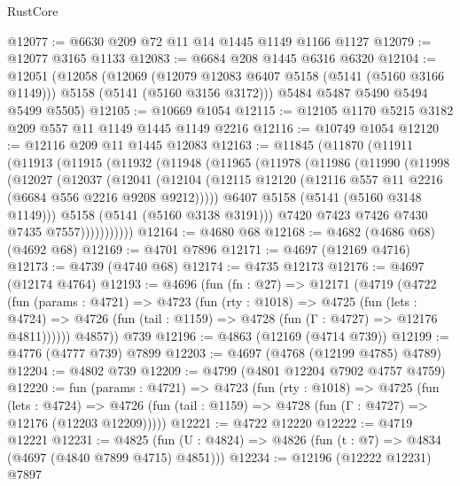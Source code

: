\begin{lexlean}{RustCore}
\begin{coremodule}
@12077 := @6630 @209 @72 @11 @14 @1445 @1149 @1166 @1127
@12079 := @12077 @3165 @1133
@12083 := @6684 @208 @1445 @6316 @6320
@12104 := @12051
    (@12058
      (@12069
        (@12079 @12083 @6407 @5158 (@5141 (@5160 @3166 @1149)))
        @5158
        (@5141 (@5160 @3156 @3172)))
      @5484
      @5487
      @5490
      @5494
      @5499
      @5505)
@12105 := @10669 @1054
@12115 := @12105 @1170 @5215 @3182 @209 @557 @11 @1149 @1445 @1149 @2216
@12116 := @10749 @1054
@12120 := @12116 @209 @11 @1445 @12083
@12163 := @11845
    (@11870
      (@11911
        (@11913
          (@11915
            (@11932
              (@11948
                (@11965
                  (@11978
                    (@11986
                      (@11990
                        (@11998
                          (@12027
                            (@12037
                              (@12041
                                (@12104
                                  (@12115
                                    @12120
                                    (@12116 @557 @11 @2216 (@6684 @556 @2216 @9208 @9212)))))
                              @6407
                              @5158
                              (@5141 (@5160 @3148 @1149)))
                            @5158
                            (@5141 (@5160 @3138 @3191)))
                          @7420
                          @7423
                          @7426
                          @7430
                          @7435
                          @7557)))))))))))
@12164 := @4680 @68
@12168 := @4682 (@4686 @68) (@4692 @68)
@12169 := @4701 @7896
@12171 := @4697 (@12169 @4716)
@12173 := @4739 (@4740 @68)
@12174 := @4735 @12173
@12176 := @4697 (@12174 @4764)
@12193 := @4696
    (fun (fn : @27) =>
    @12171
      (@4719
        (@4722
          (fun (params : @4721) =>
          @4723
            (fun (rty : @1018) =>
            @4725
              (fun (lets : @4724) =>
              @4726 (fun (tail : @1159) => @4728 (fun (Γ : @4727) => @12176 @4811))))))
        @4857))
    @739
@12196 := @4863 (@12169 (@4714 @739))
@12199 := @4776 (@4777 @739) @7899
@12203 := @4697 (@4768 (@12199 @4785) @4789)
@12204 := @4802 @739
@12209 := @4799 (@4801 @12204 @7902 @4757 @4759)
@12220 := fun (params : @4721) =>
  @4723
    (fun (rty : @1018) =>
    @4725
      (fun (lets : @4724) =>
      @4726 (fun (tail : @1159) => @4728 (fun (Γ : @4727) => @12176 (@12203 @12209)))))
@12221 := @4722 @12220
@12222 := @4719 @12221
@12231 := @4825 (fun (U : @4824) => @4826 (fun (t : @7) => @4834 (@4697 (@4840 @7899 @4715) @4851)))
@12234 := @12196 (@12222 @12231) @7897

\end{coremodule}
\end{lexlean}
